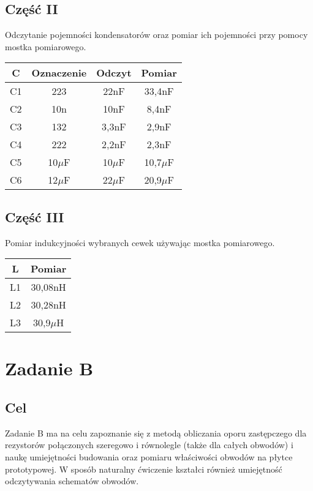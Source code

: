 \documentclass[polish,a4paper]{article}
\begin{document}
\subsection{Część II}
Odczytanie pojemności kondensatorów oraz pomiar ich pojemności przy pomocy mostka pomiarowego.\\

\begin{center}
\begin{tabular}{|c|c|c|c|}
\hline
\textbf{C} & \textbf{Oznaczenie} & \textbf{Odczyt} & \textbf{Pomiar}\\
\hline
C1 & 223 & 22nF & 33,4nF\\
\hline
C2 & 10n & 10nF & 8,4nF\\
\hline
C3 & 132 & 3,3nF & 2,9nF\\
\hline
C4 & 222 & 2,2nF & 2,3nF\\
\hline
C5 & 10$\mu$F & 10$\mu$F & 10,7$\mu$F\\
\hline
C6 & 12$\mu$F & 22$\mu$F & 20,9$\mu$F\\
\hline
\end{tabular}
\end{center}

\subsection{Część III}
Pomiar indukcyjności wybranych cewek używając mostka pomiarowego.\\

\begin{center}
\begin{tabular}{|c|c|}
\hline
\textbf{L} & \textbf{Pomiar}\\
\hline
L1 & 30,08nH\\
\hline
L2 & 30,28nH\\
\hline
L3 & 30,9$\mu$H\\
\hline
\end{tabular}
\end{center}

\section{Zadanie B}

\subsection*{Cel}

Zadanie B ma na celu zapoznanie się z metodą obliczania oporu zastępczego dla rezystorów połączonych szeregowo i równolegle (także dla całych obwodów) i naukę umiejętności budowania oraz pomiaru właściwości obwodów na płytce prototypowej. W sposób naturalny ćwiczenie kształci również umiejętność odczytywania schematów obwodów.\\
\end{document}
